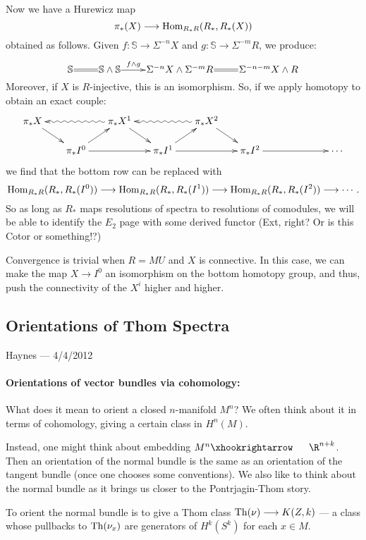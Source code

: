 \documentclass[11pt]{article}
\newcommand{\CONVERSATION}[3]{
\subsection*{#1}
\begin{flushright}
{\small #2 --- #3}
\end{flushright}
}
\begin{document}
\begin{don't show}
Now we have a Hurewicz map 
\[\pi_{*}(X)\longrightarrow\operatorname{Hom}_{R_*R}(R_*,R_*(X))\]
 obtained as follows. Given $f:\mathbb{S}\to \Sigma^{-n}X$ and $g:\mathbb{S}\to \Sigma^{-m}R$, we produce:
\[
\xymatrix@1{
\mathbb{S}\ar@{=}[r]&%
\mathbb{S}\sprod\mathbb{S}\ar[r]^-{f\sprod g}&%
\Sigma^{-n}X\sprod \Sigma^{-m}R\ar@{=}[r]&%
\Sigma^{-n-m}X\sprod R
}\]
Moreover, if $X$ is $R$-injective, this is an isomorphism. So, if we apply homotopy to obtain an exact couple:
\[\xymatrix@R=.5cm@C=.5cm@!C{
\pi_*X\ar[dr]&%
&%
\pi_*X^1\ar@{~>}[ll]\ar[dr]&%
&%
\pi_*X^2\ar@{~>}[ll]\ar[dr]&%
&%
&%
\\%
&%
\ar[ur]\pi_*I^0\ar[rr]&%
&%
\ar[ur]\pi_*I^1\ar[rr]&%
&%
\pi_*I^2\ar[rr]&%
&%
\cdots%
}\]
we find that the bottom row can be replaced with
\[\operatorname{Hom}_{R_*R}(R_*,R_*(I^0))\longrightarrow\operatorname{Hom}_{R_*R}(R_*,R_*(I^1))\longrightarrow\operatorname{Hom}_{R_*R}(R_*,R_*(I^2))\longrightarrow\cdots.\]
So as long as $R_*$ maps resolutions of spectra to resolutions of comodules, we will be able to identify the  $E_2$ page with some derived functor (Ext, right? Or is this Cotor or something!?)

\begin{rmk*}
Convergence is trivial when $R=MU$ and $X$ is connective. In this case, we can make the map $X\to I^0$ an isomorphism on the bottom homotopy group, and thus, push the connectivity of the $X^i$ higher and higher.
\end{rmk*}

\end{don't show}
\pagebreak
\CONVERSATION{Orientations of Thom Spectra}{Haynes}{4/4/2012}
\paragraph*{Orientations of vector bundles via cohomology:}
What does it mean to orient a closed $n$-manifold $M^n$? We often think about it in terms of cohomology, giving a certain class in $H^n(M)$.

Instead, one might think about embedding $M^n\cofibration \R^{n+k}$. Then an orientation of the normal bundle is the same as an orientation of the tangent bundle (once one chooses some conventions). We also like to think about the normal bundle as it brings us closer to the Pontrjagin-Thom story.

To orient the normal bundle is to give a Thom class $\operatorname{Th}(\nu)\longrightarrow K(Z,k)$ --- a class whose pullbacks to $\operatorname{Th}(\nu_x)$ are generators of $H^k(S^k)$ for each $x\in M$.
\end{document}
